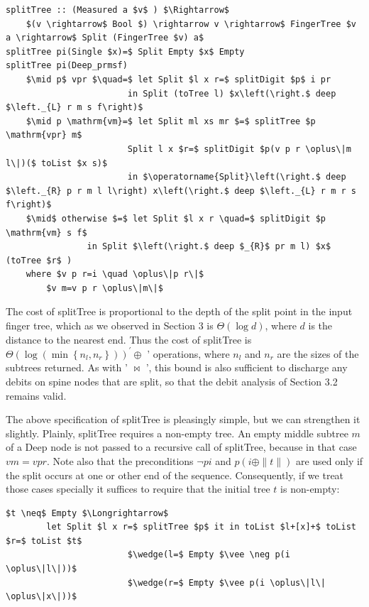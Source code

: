 \documentclass[10pt]{article}
\begin{document}
\begin{verbatim}
splitTree :: (Measured a $v$ ) $\Rightarrow$
    $(v \rightarrow$ Bool $) \rightarrow v \rightarrow$ FingerTree $v a \rightarrow$ Split (FingerTree $v) a$
splitTree pi(Single $x)=$ Split Empty $x$ Empty
splitTree pi(Deep_prmsf)
    $\mid p$ vpr $\quad=$ let Split $l x r=$ splitDigit $p$ i pr
                        in Split (toTree l) $x\left(\right.$ deep $\left._{L} r m s f\right)$
    $\mid p \mathrm{vm}=$ let Split ml xs mr $=$ splitTree $p \mathrm{vpr} m$
                        Split l x $r=$ splitDigit $p(v p r \oplus\|m l\|)($ toList $x s)$
                        in $\operatorname{Split}\left(\right.$ deep $\left._{R} p r m l l\right) x\left(\right.$ deep $\left._{L} r m r s f\right)$
    $\mid$ otherwise $=$ let Split $l x r \quad=$ splitDigit $p \mathrm{vm} s f$
                in Split $\left(\right.$ deep $_{R}$ pr m l) $x$ (toTree $r$ )
    where $v p r=i \quad \oplus\|p r\|$
        $v m=v p r \oplus\|m\|$
\end{verbatim}

The cost of splitTree is proportional to the depth of the split point in the input finger tree, which as we observed in Section 3 is $\Theta(\log d)$, where $d$ is the distance to the nearest end. Thus the cost of splitTree is $\Theta\left(\log \left(\min \left\{n_{l}, n_{r}\right\}\right)\right)^{\prime} \oplus$ ' operations, where $n_{l}$ and $n_{r}$ are the sizes of the subtrees returned. As with ' $\bowtie$ ', this bound is also sufficient to discharge any debits on spine nodes that are split, so that the debit analysis of Section 3.2 remains valid.

The above specification of splitTree is pleasingly simple, but we can strengthen it slightly. Plainly, splitTree requires a non-empty tree. An empty middle subtree $m$ of a Deep node is not passed to a recursive call of splitTree, because in that case $v m=v p r$. Note also that the preconditions $\neg p i$ and $p(i \oplus\|t\|)$ are used only if the split occurs at one or other end of the sequence. Consequently, if we treat those cases specially it suffices to require that the initial tree $t$ is non-empty:

\begin{verbatim}
$t \neq$ Empty $\Longrightarrow$
        let Split $l x r=$ splitTree $p$ it in toList $l+[x]+$ toList $r=$ toList $t$
                        $\wedge(l=$ Empty $\vee \neg p(i \oplus\|l\|))$
                        $\wedge(r=$ Empty $\vee p(i \oplus\|l\| \oplus\|x\|))$
\end{verbatim}
\end{document}
